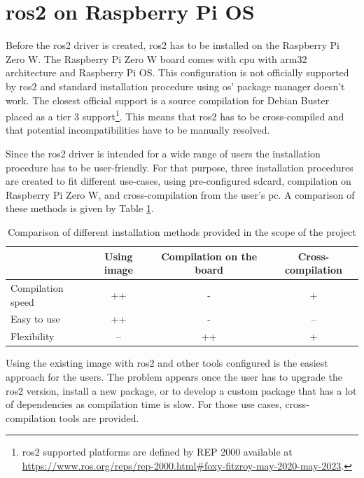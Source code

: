 \section{\ac{ros2} on Raspberry Pi OS}
Before the \ac{ros2} driver is created, \ac{ros2} has to be installed on the Raspberry Pi Zero W.
The Raspberry Pi Zero W board comes with \ac{cpu} with arm32 architecture and Raspberry Pi OS.
This configuration is not officially supported by \ac{ros2} and standard installation procedure using \acs{os}' package manager doesn't work.
The closest official support is a source compilation for Debian Buster placed as a tier 3 support\footnote{\ac{ros2} supported platforms are defined by REP 2000 available at \url{https://www.ros.org/reps/rep-2000.html\#foxy-fitzroy-may-2020-may-2023}.}.
This means that \ac{ros2} has to be cross-compiled and that potential incompatibilities have to be manually resolved.

Since the \ac{ros2} driver is intended for a wide range of users the installation procedure has to be user-friendly.
For that purpose, three installation procedures are created to fit different use-cases, using pre-configured \ac{sdcard}, compilation on Raspberry Pi Zero W, and cross-compilation from the user's \ac{pc}.
A comparison of these methods is given by Table \ref{tab:physical:installation}.

\begin{table}[H]
    \begin{adjustwidth}{-1.5in}{-1.5in}
    \centering
    \begin{tabular}{|l|c|c|c|}
        \hline
        & \textbf{Using image} & \textbf{Compilation on the board} & \textbf{Cross-compilation} \\
        \hline
        Compilation speed & ++ & - & + \\
        \hline
        Easy to use & ++ & - & -- \\
        \hline
        Flexibility & -- & ++ & + \\
        \hline
    \end{tabular}
    \caption{Comparison of different installation methods provided in the scope of the project}
    \label{tab:physical:installation}
    \end{adjustwidth}
\end{table}

Using the existing image with \ac{ros2} and other tools configured is the easiest approach for the users.
The problem appears once the user has to upgrade the \ac{ros2} version, install a new package, or to develop a custom package that has a lot of dependencies as compilation time is slow.
For those use cases, cross-compilation tools are provided.

